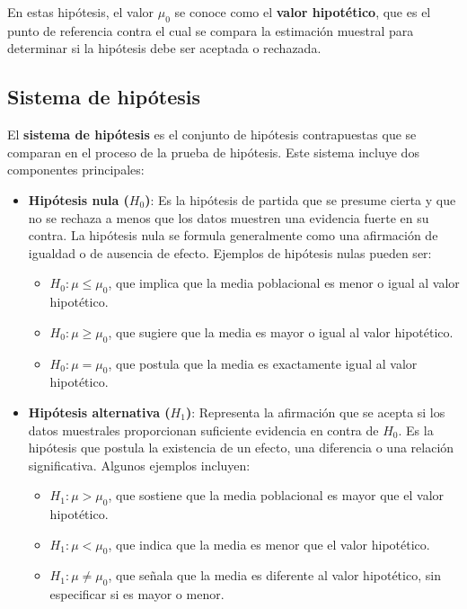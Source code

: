 \documentclass[
  letterpaper,
  DIV=11,
  numbers=noendperiod]{scrreprt}
\providecommand{\tightlist}{%
  \setlength{\itemsep}{0pt}\setlength{\parskip}{0pt}}\usepackage{longtable,booktabs,array}
\begin{document}
En estas hipótesis, el valor \(\mu_0\) se conoce como el \textbf{valor
hipotético}, que es el punto de referencia contra el cual se compara la
estimación muestral para determinar si la hipótesis debe ser aceptada o
rechazada.

\subsection{Sistema de hipótesis}\label{sistema-de-hipuxf3tesis}

El \textbf{sistema de hipótesis} es el conjunto de hipótesis
contrapuestas que se comparan en el proceso de la prueba de hipótesis.
Este sistema incluye dos componentes principales:

\begin{itemize}
\tightlist
\item
  \textbf{Hipótesis nula (\(H_0\))}: Es la hipótesis de partida que se
  presume cierta y que no se rechaza a menos que los datos muestren una
  evidencia fuerte en su contra. La hipótesis nula se formula
  generalmente como una afirmación de igualdad o de ausencia de efecto.
  Ejemplos de hipótesis nulas pueden ser:

  \begin{itemize}
  \tightlist
  \item
    \(H_0: \mu \leq \mu_0\), que implica que la media poblacional es
    menor o igual al valor hipotético.
  \item
    \(H_0: \mu \geq \mu_0\), que sugiere que la media es mayor o igual
    al valor hipotético.
  \item
    \(H_0: \mu = \mu_0\), que postula que la media es exactamente igual
    al valor hipotético.
  \end{itemize}
\item
  \textbf{Hipótesis alternativa (\(H_1\))}: Representa la afirmación que
  se acepta si los datos muestrales proporcionan suficiente evidencia en
  contra de \(H_0\). Es la hipótesis que postula la existencia de un
  efecto, una diferencia o una relación significativa. Algunos ejemplos
  incluyen:

  \begin{itemize}
  \tightlist
  \item
    \(H_1: \mu > \mu_0\), que sostiene que la media poblacional es mayor
    que el valor hipotético.
  \item
    \(H_1: \mu < \mu_0\), que indica que la media es menor que el valor
    hipotético.
  \item
    \(H_1: \mu \neq \mu_0\), que señala que la media es diferente al
    valor hipotético, sin especificar si es mayor o menor.
  \end{itemize}
\end{itemize}
\end{document}
